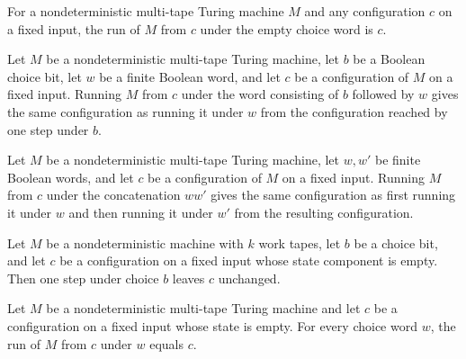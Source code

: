 \begin{lemma}
\label{Turing.NDTM.runWith_nil}
\leanok
{}
For a nondeterministic multi-tape Turing machine $M$ and any configuration $c$ on a
fixed input, the run of $M$ from $c$ under the empty choice word is $c$.
\end{lemma}

\begin{lemma}
\label{Turing.NDTM.runWith_cons}
\leanok
{}
Let $M$ be a nondeterministic multi-tape Turing machine, let $b$ be a Boolean choice
bit, let $w$ be a finite Boolean word, and let $c$ be a configuration of $M$ on a fixed
input. Running $M$ from $c$ under the word consisting of $b$ followed by $w$ gives the
same configuration as running it under $w$ from the configuration reached by one step
under $b$.
\end{lemma}

\begin{lemma}
\label{Turing.NDTM.runWith_append}
\leanok
{}
Let $M$ be a nondeterministic multi-tape Turing machine, let $w,w'$ be finite Boolean
words, and let $c$ be a configuration of $M$ on a fixed input. Running $M$ from $c$
under the concatenation $ww'$ gives the same configuration as first running it under $w$
and then running it under $w'$ from the resulting configuration.
\end{lemma}

\begin{lemma}
\label{Turing.NDTM.stepWith_of_halt}
\leanok
{}
Let $M$ be a nondeterministic machine with $k$ work tapes, let $b$ be a choice bit, and
let $c$ be a configuration on a fixed input whose state component is empty. Then one
step under choice $b$ leaves $c$ unchanged.
\end{lemma}

\begin{lemma}
\label{Turing.NDTM.runWith_of_halt}
\leanok
{}
Let $M$ be a nondeterministic multi-tape Turing machine and let $c$ be a configuration
on a fixed input whose state is empty. For every choice word $w$, the run of $M$ from
$c$ under $w$ equals $c$.
\end{lemma}


